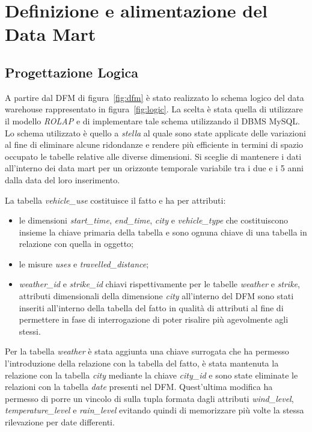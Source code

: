 \chapter{Definizione e alimentazione del Data Mart}

\section{Progettazione Logica}

A partire dal DFM di figura~\ref{fig:dfm} è stato realizzato lo schema
logico del data warehouse rappresentato in figura~\ref{fig:logic}.
La scelta è stata quella di utilizzare il modello \textit{ROLAP} e di
implementare tale schema utilizzando il DBMS MySQL.
Lo schema utilizzato è quello a \textit{stella} al quale sono state applicate
delle variazioni al fine di eliminare alcune ridondanze e rendere più efficiente
in termini di spazio occupato le tabelle relative alle diverse dimensioni.
Si sceglie di mantenere i dati all'interno dei data mart per un orizzonte
temporale variabile tra i due e i 5 anni dalla data del loro inserimento.

La tabella \textit{vehicle\_use} costituisce il fatto e ha per attributi:
\begin{itemize}
\item le dimensioni \textit{start\_time}, \textit{end\_time}, \textit{city} e
\textit{vehicle\_type} che costituiscono insieme la chiave primaria della
tabella e sono ognuna chiave di una tabella in relazione con quella in oggetto;
\item le misure \textit{uses} e \textit{travelled\_distance};
\item \textit{weather\_id} e \textit{strike\_id} chiavi rispettivamente per
le tabelle \textit{weather} e \textit{strike}, attributi dimensionali della
dimensione \textit{city} all'interno del DFM sono stati inseriti all'interno
della tabella del fatto in qualità di attributi al fine di permettere in
fase di interrogazione di poter risalire più agevolmente agli stessi.
\end{itemize}

Per la tabella \textit{weather} è stata aggiunta una chiave surrogata che ha
permesso l'introduzione della relazione con la tabella del fatto, è stata
mantenuta la relazione con la tabella \textit{city} mediante la chiave
\textit{city\_id} e sono state eliminate le relazioni con la tabella
\textit{date} presenti nel DFM. Quest'ultima modifica ha permesso di
porre un vincolo di  sulla tupla formata dagli attributi
\textit{wind\_level}, \textit{temperature\_level} e \textit{rain\_level}
evitando quindi di memorizzare più volte la stessa rilevazione per date
differenti.

